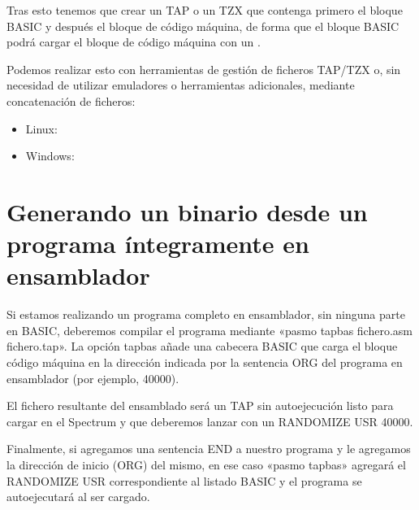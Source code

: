 \documentclass[letterpaper,10pt,spanish]{sphinxmanual}
\begin{document}
Tras esto tenemos que crear un TAP o un TZX que contenga primero el bloque BASIC y después el bloque de código máquina, de forma que el bloque BASIC podrá cargar el bloque de código máquina con un .

Podemos realizar esto con herramientas de gestión de ficheros TAP/TZX o, sin necesidad de utilizar emuladores o herramientas adicionales, mediante concatenación de ficheros:
\begin{itemize}
\item {} 
Linux: 

\item {} 
Windows: 

\end{itemize}


\section{Generando un binario desde un programa íntegramente en ensamblador}
\label{\detokenize{02_introduccion/introduccion:generando-un-binario-desde-un-programa-integramente-en-ensamblador}}
Si estamos realizando un programa completo en ensamblador, sin ninguna parte en BASIC, deberemos compilar el programa mediante «pasmo \textendash{}tapbas fichero.asm fichero.tap». La opción \textendash{}tapbas añade una cabecera BASIC que carga el bloque código máquina en la dirección indicada por la sentencia ORG del programa en ensamblador (por ejemplo, 40000).

El fichero resultante del ensamblado será un TAP sin autoejecución listo para cargar en el Spectrum y que deberemos lanzar con un RANDOMIZE USR 40000.

Finalmente, si agregamos una sentencia END a nuestro programa y le agregamos la dirección de inicio (ORG) del mismo, en ese caso «pasmo \textendash{}tapbas» agregará el RANDOMIZE USR correspondiente al listado BASIC y el programa se autoejecutará al ser cargado.

\begin{sphinxVerbatim}[commandchars=\\\{\}]
 
  
  
  
  
  
             
\end{sphinxVerbatim}
\end{document}
